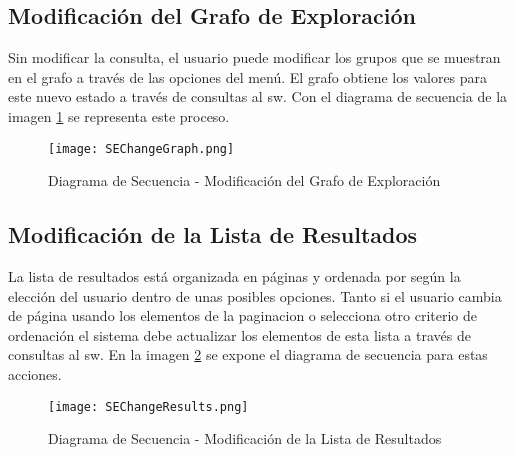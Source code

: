 \subsection{Modificación del Grafo de Exploración}
Sin modificar la consulta, el usuario puede modificar los grupos que se muestran en el grafo a través de las opciones del menú. El grafo obtiene los valores para este nuevo estado a través de consultas al \gls{sw}. Con el diagrama de secuencia de la imagen \ref{image:runtime-graph} se representa este proceso.

\begin{figure}[H]
  \centering
  	\texttt{[image: SEChangeGraph.png]}
  \caption{Diagrama de Secuencia - Modificación del Grafo de Exploración}
  \label{image:runtime-graph}
\end{figure}

\subsection{Modificación de la Lista de Resultados}
La lista de resultados está organizada en páginas y ordenada por según la elección del usuario dentro de unas posibles opciones. Tanto si el usuario cambia de página usando los elementos de la \gls{paginacion} o selecciona otro criterio de ordenación el sistema debe actualizar los elementos de esta lista a través de consultas al \gls{sw}. En la imagen \ref{image:runtime-results} se expone el diagrama de secuencia para estas acciones.

\begin{figure}[H]
  \centering
  	\texttt{[image: SEChangeResults.png]}
  \caption{Diagrama de Secuencia - Modificación de la Lista de Resultados}
  \label{image:runtime-results}
\end{figure}


